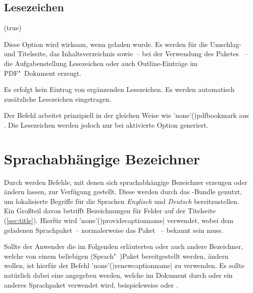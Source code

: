 \begin{DeclareEntity*}{}
\begin{DeclareEntity*}{}
\begin{DeclareEntity*}{}
\subsection{%
  Lesezeichen%
}

\begin{Declaration}
  {}
  (true)
\begin{Declaration}
  {}
\printdeclarationlist

Diese Option wird wirksam, wenn  geladen wurde. Es werden für 
die Umschlag- und Titelseite, das Inhaltsverzeichnis sowie~-- bei der 
Verwendung des Paketes ~-- die Aufgabenstellung 
Lesezeichen oder auch Outline-Einträge im PDF"~Dokument erzeugt.
\begin{DeclareValues}{}
  Es erfolgt kein Eintrag von ergänzenden Lesezeichen.
  Es werden automatisch zusätzliche Lesezeichen eingetragen.
\end{DeclareValues}
Der Befehl  arbeitet prinzipiell in der gleichen Weise wie 
\Macro'none'(){pdfbookmark} aus . Die 
Lesezeichen werden jedoch nur bei aktivierte Option  
generiert.
\end{Declaration}
\end{Declaration}



\section{%
  Sprachabhängige Bezeichner%
  \label{sec:localization}%
}

Durch \KOMAScript werden Befehle, mit denen sich sprachabhängige Bezeichner 
erzeugen oder ändern lassen, zur Verfügung gestellt. Diese werden durch das
\TUDScript-Bundle genutzt, um lokalisierte Begriffe für die Sprachen 
\emph{Englisch} und \emph{Deutsch} bereitzustellen. Ein Großteil davon betrifft 
Bezeichnungen für Felder auf der Titelseite (\autoref{sec:title}). Hierfür wird
\Macro'none'(){providecaptionname|}
verwendet, wobei  dem geladenen Sprachpaket~-- normalerweise das 
Paket ~-- bekannt sein muss.

Sollte der Anwender die im Folgenden erläuterten oder auch andere Bezeichner, 
welche von einem beliebigen (Sprach"~)Paket bereitgestellt werden, ändern 
wollen, ist hierfür der Befehl
\Macro'none'(){renewcaptionname|}
zu verwenden. Es sollte natürlich dabei eine  angegeben werden, 
welche im Dokument durch  oder ein anderes Sprachpaket verwendet 
wird, beispielsweise  oder . 


\end{DeclareEntity*}
\end{DeclareEntity*}
\end{DeclareEntity*}
